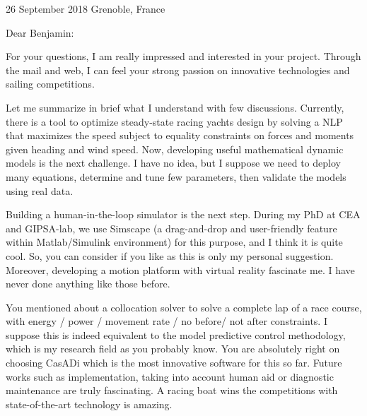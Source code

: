 \documentclass[a4paper,11pt]{article}
\begin{document}
{\hspace*{-\marginparsep minus \marginparwidth}
\begin{minipage}[t]{\textwidth+\marginparwidth+\marginparsep}
	
26 September 2018 \hfill{Grenoble, France}

%
%

\vspace{0.75cm}

Dear Benjamin:

\vspace{0.3cm}

For your questions, I am really impressed and interested in your project. Through the mail and web, I can feel your strong passion on innovative technologies and sailing competitions.

\vspace{0.3cm}

Let me summarize in brief what I understand with few discussions. Currently, there is a tool to optimize steady-state racing yachts design by solving a NLP that maximizes the speed subject to equality constraints on forces and moments given heading and wind speed. Now, developing useful mathematical dynamic models is the next challenge. I have no idea, but I suppose we need to deploy many equations, determine and tune few parameters, then validate the models using real data. 

\vspace{0.3cm}

Building a human-in-the-loop simulator is the next step. During my PhD at CEA and GIPSA-lab, we use Simscape (a drag-and-drop and user-friendly feature within Matlab/Simulink environment) for this purpose, and I think it is quite cool. So, you can consider if you like as this is only my personal suggestion. Moreover, developing a motion platform with virtual reality fascinate me. I have never done anything like those before.

\vspace{0.3cm}

You mentioned about a collocation solver to solve a complete lap of a race course, with energy / power / movement rate / no before/ not after constraints. I suppose this is indeed equivalent to the model predictive control methodology, which is my research field as you probably know. You are absolutely right on choosing CasADi which is the most innovative software for this so far. Future works such as implementation, taking into account human aid or diagnostic maintenance are truly fascinating. A racing boat wins the competitions with state-of-the-art technology is amazing.


\end{minipage}}
\end{document}
